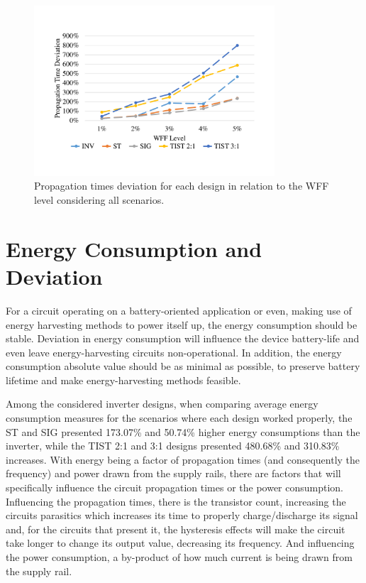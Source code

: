 \documentclass[pgmicro,diss,english]{iiufrgs}
\begin{document}
\begin{figure}[h]
	\centering
		\includegraphics[width=0.8\textwidth, trim={2cm 3cm 2cm 3cm}, clip]{delayDevWFF.pdf}
		\caption{Propagation times deviation for each design in relation to the WFF level considering all scenarios.}
	\label{fig:delaysDev}
\end{figure}

\section{Energy Consumption and Deviation}

For a circuit operating on a battery-oriented application or even, making use of energy harvesting methods to power itself up, the energy consumption should be stable. Deviation in energy consumption will influence the device battery-life and even leave energy-harvesting circuits non-operational. In addition, the energy consumption absolute value should be as minimal as possible, to preserve battery lifetime and make energy-harvesting methods feasible.

Among the considered inverter designs, when comparing average energy consumption measures for the scenarios where each design worked properly, the ST and SIG presented 173.07\% and 50.74\% higher energy consumptions than the inverter, while the TIST 2:1 and 3:1 designs presented 480.68\% and 310.83\% increases. With energy being a factor of propagation times (and consequently the frequency) and power drawn from the supply rails, there are factors that will specifically influence the circuit propagation times or the power consumption. Influencing the propagation times, there is the transistor count, increasing the circuits parasitics which increases its time to properly charge/discharge its signal and, for the circuits that present it, the hysteresis effects will make the circuit take longer to change its output value, decreasing its frequency. And influencing the power consumption, a by-product of how much current is being drawn from the supply rail.
\end{document}
